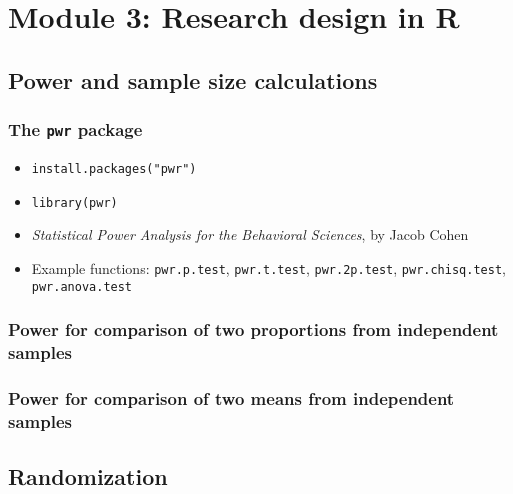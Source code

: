 \documentclass{beamer}
\begin{document}

\section{Module 3: Research design in R}

\subsection{Power and sample size calculations}

\begin{frame}
    \frametitle{The \texttt{pwr} package}
    \begin{itemize}
      \item \texttt{install.packages("pwr")}
      \item \texttt{library(pwr)}
      \item \emph{Statistical Power Analysis for the Behavioral Sciences}, by Jacob Cohen
      \item Example functions: \texttt{pwr.p.test},
            \texttt{pwr.t.test}, \texttt{pwr.2p.test},
            \texttt{pwr.chisq.test}, \texttt{pwr.anova.test}
    \end{itemize}
\end{frame}


\begin{frame}[fragile]
    \frametitle{Power for comparison of two proportions from independent samples}
    \fontsize{10}{12}\selectfont
    
\end{frame}


\begin{frame}[fragile]
    \frametitle{Power for comparison of two means from independent samples}
    \fontsize{10}{12}\selectfont
    
\end{frame}




\subsection{Randomization}
\end{document}
